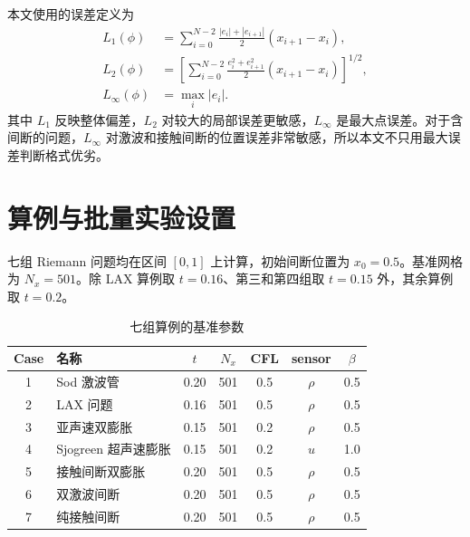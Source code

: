 \documentclass[UTF8,12pt,a4paper]{ctexart}
\begin{document}
本文使用的误差定义为
\begin{align}
    L_1(\phi)
    &=
    \sum_{i=0}^{N-2}
    \frac{|e_i|+|e_{i+1}|}{2}
    (x_{i+1}-x_i),
    \\
    L_2(\phi)
    &=
    \left[
    \sum_{i=0}^{N-2}
    \frac{e_i^2+e_{i+1}^2}{2}
    (x_{i+1}-x_i)
    \right]^{1/2},
    \\
    L_\infty(\phi)
    &=
    \max_i |e_i|.
\end{align}
其中 $L_1$ 反映整体偏差，$L_2$ 对较大的局部误差更敏感，$L_\infty$ 是最大点误差。对于含间断的问题，$L_\infty$ 对激波和接触间断的位置误差非常敏感，所以本文不只用最大误差判断格式优劣。

\section{算例与批量实验设置}

七组 Riemann 问题均在区间 $[0,1]$ 上计算，初始间断位置为 $x_0=0.5$。基准网格为 $N_x=501$。除 LAX 算例取 $t=0.16$、第三和第四组取 $t=0.15$ 外，其余算例取 $t=0.2$。

\begin{table}[H]
    \centering
    \caption{七组算例的基准参数}
    \begin{tabular}{clccccc}
        \toprule
        Case & 名称 & $t$ & $N_x$ & CFL & sensor & $\beta$ \\
        \midrule
        1 & Sod 激波管 & 0.20 & 501 & 0.5 & $\rho$ & 0.5 \\
        2 & LAX 问题 & 0.16 & 501 & 0.5 & $\rho$ & 0.5 \\
        3 & 亚声速双膨胀 & 0.15 & 501 & 0.2 & $\rho$ & 0.5 \\
        4 & Sjogreen 超声速膨胀 & 0.15 & 501 & 0.2 & $u$ & 1.0 \\
        5 & 接触间断双膨胀 & 0.20 & 501 & 0.5 & $\rho$ & 0.5 \\
        6 & 双激波间断 & 0.20 & 501 & 0.5 & $\rho$ & 0.5 \\
        7 & 纯接触间断 & 0.20 & 501 & 0.5 & $\rho$ & 0.5 \\
        \bottomrule
    \end{tabular}
\end{table}
\end{document}
